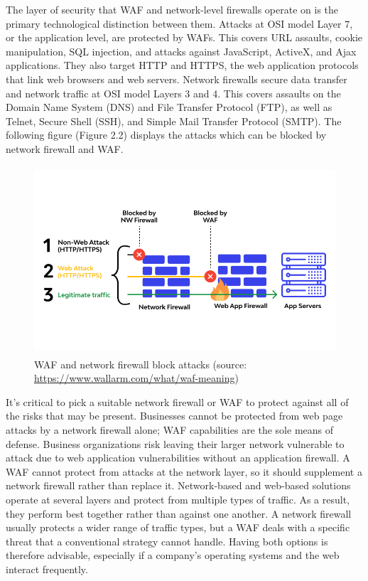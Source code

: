 The layer of security that WAF and network-level firewalls operate on is the primary technological distinction between them. Attacks at OSI model Layer 7, or the application level, are protected by WAFs. This covers URL assaults, cookie manipulation, SQL injection, and attacks against JavaScript, ActiveX, and Ajax applications. They also target HTTP and HTTPS, the web application protocols that link web browsers and web servers. Network firewalls secure data transfer and network traffic at OSI model Layers 3 and 4. This covers assaults on the Domain Name System (DNS) and File Transfer Protocol (FTP), as well as Telnet, Secure Shell (SSH), and Simple Mail Transfer Protocol (SMTP). The following figure (Figure 2.2) displays the attacks which can be blocked by network firewall and WAF.
\begin{figure}[ht]
	\centering
	\includegraphics[width=\linewidth, height=7cm,keepaspectratio]{figures/waf3.png}
	\caption{WAF and network firewall block attacks (source: \url{https://www.wallarm.com/what/waf-meaning})}
\end{figure}
\newpage
It's critical to pick a suitable network firewall or WAF to protect against all of the risks that may be present. Businesses cannot be protected from web page attacks by a network firewall alone; WAF capabilities are the sole means of defense. Business organizations risk leaving their larger network vulnerable to attack due to web application vulnerabilities without an application firewall. A WAF cannot protect from attacks at the network layer, so it should supplement a network firewall rather than replace it. Network-based and web-based solutions operate at several layers and protect from multiple types of traffic. As a result, they perform best together rather than against one another. A network firewall usually protects a wider range of traffic types, but a WAF deals with a specific threat that a conventional strategy cannot handle. Having both options is therefore advisable, especially if a company's operating systems and the web interact frequently.
